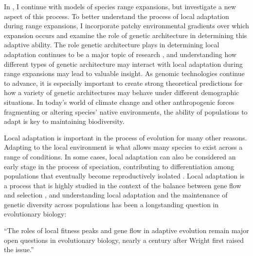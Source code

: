 In , I continue with models of species range expansions, but investigate a new aspect of this process. To better understand the process of local adaptation during range expansions, I incorporate patchy environmental gradients over which expansion occurs and examine the role of genetic architecture in determining this adaptive ability. The role genetic architecture plays in determining local adaptation continues to be a major topic of research \citep{Holt:2003, Yeaman:2015, Yeaman:2011, Carroll:2001, Holloway:1990, Peichel:2001, Bratteler:2006, Schiffers:2014}, and understanding how different types of genetic architecture may interact with local adaptation during range expansions may lead to valuable insight. As genomic technologies continue to advance, it is especially important to create strong theoretical predictions for how a variety of genetic architectures may behave under different demographic situations. In today's world of climate change and other anthropogenic forces fragmenting or altering species' native environments, the ability of populations to adapt is key to maintaining biodiversity. %

Local adaptation is important in the process of evolution for many other reasons. Adapting to the local environment is what allows many species to exist across a range of conditions. In some cases, local adaptation can also be considered an early stage in the process of speciation, contributing to differentiation among populations that eventually become reproductively isolated \citep{Via:2012, Kirkpatrick:2006}. Local adaptation is a process that is highly studied in the context of the balance between gene flow and selection \citep{Kawecki:2004}, and understanding local adaptation and the maintenance of genetic diversity across populations has been a longstanding question in evolutionary biology:
\begin{quoteshrink}
  ``The roles of local fitness peaks and gene flow in adaptive evolution remain major open questions in evolutionary biology, nearly a century after Wright first raised the issue.''
  \hfill\citet{Barton:2016}
\end{quoteshrink}

